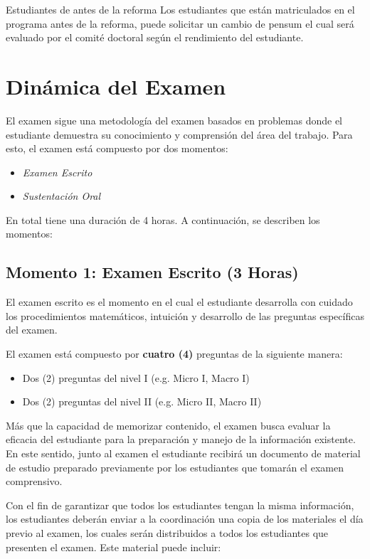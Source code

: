 \begin{myremark}{Estudiantes de antes de la reforma}
Los estudiantes que están matriculados en el programa antes de la reforma, puede solicitar un cambio de pensum el cual será evaluado por el comité doctoral según el rendimiento del estudiante.
\end{myremark}


\section{Dinámica del Examen}

El examen sigue una metodología del examen basados en problemas donde el estudiante demuestra su conocimiento y comprensión del área del trabajo. Para esto, el examen está compuesto por dos momentos: 

\begin{itemize}
    \item \emph{Examen Escrito} 
    \item \emph{Sustentación Oral}
\end{itemize}

En total tiene una duración de 4 horas. A continuación, se describen los momentos:

\subsection{Momento 1: Examen Escrito (3 Horas)}

El examen escrito es el momento en el cual el estudiante desarrolla con cuidado los procedimientos matemáticos, intuición y desarrollo de las preguntas específicas del examen. 

El examen está compuesto por \textbf{cuatro (4)} preguntas de la siguiente manera:

\begin{itemize}
    \item Dos (2) preguntas del nivel I (e.g. Micro I, Macro I)
    \item Dos (2)  preguntas del nivel II (e.g. Micro II, Macro II)
\end{itemize}

Más que la capacidad de memorizar contenido, el examen busca evaluar la eficacia del estudiante para la preparación y manejo de la información existente. En este sentido, junto al examen el estudiante recibirá un documento de material de estudio preparado previamente por los estudiantes que tomarán el examen comprensivo. 

Con el fin de garantizar que todos los estudiantes tengan la misma información, los estudiantes deberán enviar a la coordinación una copia de los materiales el día previo al examen, los cuales serán distribuidos a todos los estudiantes que presenten el examen. Este material puede incluir: 

